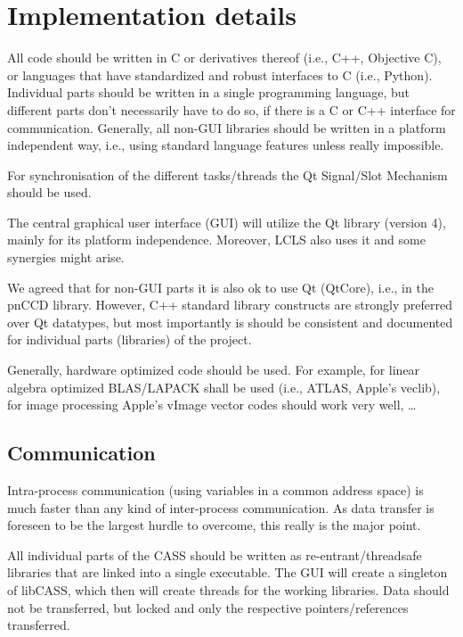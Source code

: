\documentclass[11pt,a4paper,oneside]{article}
\begin{document}
\section{Implementation details}
\label{sec:implementation}

All code should be written in C or derivatives thereof (i.e., C++, Objective C), or languages that have standardized and robust interfaces to C (i.e., Python). Individual parts should be written in a single programming language, but different parts don't necessarily have to do so, if there is a C or C++ interface for communication. Generally, all non-GUI libraries should be written in a platform independent way, i.e., using standard language features unless really impossible. 

For synchronisation of the different tasks/threads the Qt Signal/Slot Mechanism should be used.

The central graphical user interface (GUI) will utilize the Qt library (version 4), mainly for its platform independence. Moreover, LCLS also uses it and some synergies might arise.

We agreed that for non-GUI parts it is also ok to use Qt (QtCore), i.e., in the pnCCD library. However, C++ standard library constructs are strongly preferred over Qt datatypes, but most importantly is should be consistent and documented for individual parts (libraries) of the project.

Generally, hardware optimized code should be used. For example, for linear algebra optimized BLAS/LAPACK shall be used (i.e., ATLAS, Apple's veclib), for image processing Apple's vImage vector codes should work very well, \dots

\subsection{Communication}
\label{sec:communication}

Intra-process communication (using variables in a common address space) is much faster than any kind of inter-process communication. As data transfer is foreseen to be the largest hurdle to overcome, this really is the major point.

All individual parts of the CASS should be written as re-entrant/threadsafe libraries that are linked into a single executable. The GUI will create a singleton of libCASS, which then will create threads for the working libraries. Data should not be transferred, but locked and only the respective pointers/references transferred.
\end{document}
